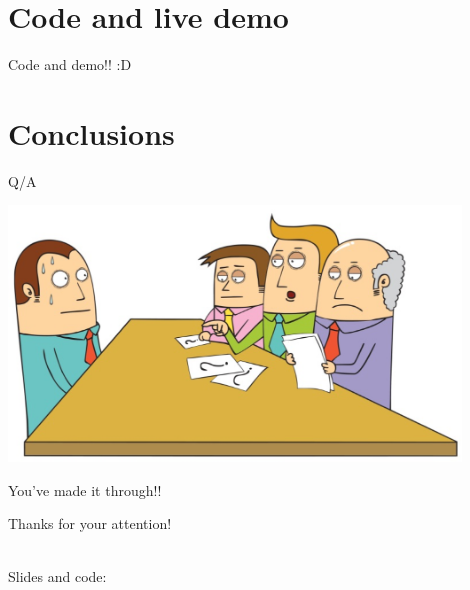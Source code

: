 \documentclass[10pt]{beamer}
\begin{document}
	
	\section{Code and live demo}
	
	\begin{frame}{Code and demo!! :D}
	\begin{center}
	\href{http://localhost:8888/notebooks/notebooks/Pycon9_MarkovChains.ipynb}{}
	\end{center}
	\end{frame}
	
	
	\section{Conclusions}
	
	\begin{frame}{Q/A}
		\begin{center}
		\includegraphics[width=0.9\textwidth]{imgs/qa.png}
		\end{center}
	\end{frame}	
	
	
	\begin{frame}{You've made it through!!}
		\begin{center}
		\Huge{Thanks for your attention!\\}
		\footnotesize\href{mailto:pietro_mascolo@optum.com}{}\\
		\vspace{0.2cm}
		\footnotesize \href{https://twitter.com/iz4vve}{}

		\vspace{1.5cm}
		\small
		Slides and code:
		\href{http://bit.ly/2H8giAW}{  }
		\end{center}
	\end{frame}
\end{document}
